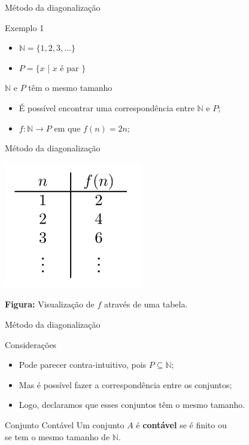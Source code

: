 \documentclass[xcolor=dvipsnames,table]{beamer}
\begin{document}
	\begin{frame}{Método da diagonalização}
		\begin{block}{Exemplo 1}
			\begin{itemize}
				\item $\mathbb{N} = \{ 1, 2, 3, ... \}$
				\item $P = \{ x$ | $x$ é par $\}$
			\end{itemize} 
		\end{block} \pause
		\begin{block}{$\mathbb{N}$ e $P$ têm o mesmo tamanho} \pause
			\begin{itemize}
				\item É possível encontrar uma correspondência entre $\mathbb{N}$ e $P$; \pause
				\item $f:\mathbb{N} \rightarrow P$ em que $f(n) = 2n$;
			\end{itemize}
		\end{block}	
	\end{frame}
	
	\begin{frame}{Método da diagonalização}
		\begin{center}
			\includegraphics[width=6cm]{images/fn2n.png}
			
			{\bf Figura:} Visualização de $f$ através de uma tabela.
		\end{center}
	\end{frame}
	
	\begin{frame}{Método da diagonalização}
		\begin{block}{Considerações}
			\begin{itemize}
				\item Pode parecer contra-intuitivo, pois $P \subseteq \mathbb{N}$; \pause
				\item Mas é possível fazer a correspondência entre os conjuntos; \pause
				\item Logo, declaramos que esses conjuntos têm o mesmo tamanho.			
			\end{itemize}
		\end{block} \pause
		\begin{block}{Conjunto Contável}
			Um conjunto $A$ é {\bf contável} se é finito ou \\se tem o mesmo tamanho de $\mathbb{N}$.
		\end{block}
	\end{frame}
	
\end{document}
